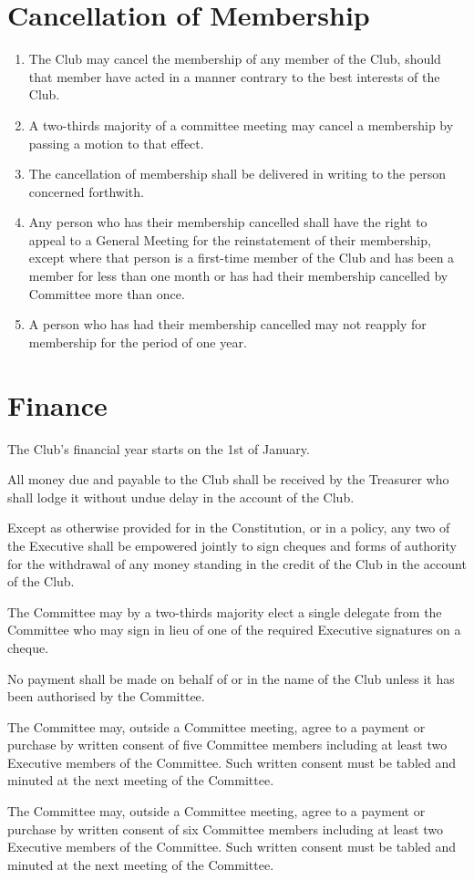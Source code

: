 \documentclass[11pt]{article} %
\begin{document}
\section{Cancellation of Membership}
\begin{enumerate}
\item The Club may cancel the membership of any member of the Club, should that member have acted in a manner contrary to the best interests of the Club.
\item A two-thirds majority of a committee meeting may cancel a membership by passing a motion to that effect.
\item The cancellation of membership shall be delivered in writing to the person concerned forthwith.
\item Any person who has their membership cancelled shall have the right to appeal to a General Meeting for the reinstatement of their membership, except where that person is a first-time member of the Club and has been a member for less than one month or has had their membership cancelled by Committee more than once.
\item A person who has had their membership cancelled may not reapply for membership for the period of one year.
\end{enumerate}

\section{Finance}
\begin{enumerate}
	{\color{ForestGreen}\item The Club's financial year starts on the 1st of January.}
	\item All money due and payable to the Club shall be received by the Treasurer who shall lodge it without undue delay in the account of the Club.
	\item Except as otherwise provided for in the Constitution, or in a policy, any two of the Executive shall be empowered jointly to sign cheques and forms of authority for the withdrawal of any money standing in the credit of the Club in the account of the Club.
	\item The Committee may by a two-thirds majority elect a single delegate from the Committee who may sign in lieu of one of the required Executive signatures on a cheque.
	\item No payment shall be made on behalf of or in the name of the Club unless it has been authorised by the Committee.
	{\color{red}\item The Committee may, outside a Committee meeting, agree to a payment or purchase by written consent of five Committee members including at least two Executive members of the Committee. Such written consent must be tabled and minuted at the next meeting of the Committee.}
	{\color{ForestGreen}\item The Committee may, outside a Committee meeting, agree to a payment or purchase by written consent of six Committee members including at least two Executive members of the Committee. Such written consent must be tabled and minuted at the next meeting of the Committee.}
\end{enumerate}
\end{document}
